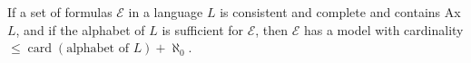 If a set of formulas $\mathcal{E}$ in a language $L$ is consistent and complete and contains Ax $L$, and if the alphabet of $L$ is sufficient for $\mathcal{E}$, then $\mathcal{E}$ has a model with cardinality $\leqslant \operatorname{card}(\text{alphabet of } L) + \aleph_0$.
